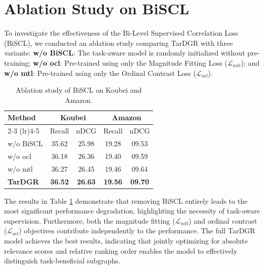 \documentclass[letterpaper]{article} %
\begin{document}
\section{Ablation Study on BiSCL}
To investigate the effectiveness of the Bi-Level Supervised Correlation Loss (BiSCL), we conducted an ablation study comparing TarDGR with three variants:
 \textbf{w/o BiSCL}: The task-aware model is randomly initialized without pre-training;
 \textbf{w/o ocl}: Pre-trained using only the Magnitude Fitting Loss ($\mathcal{L}_{mtl}$); and
 \textbf{w/o mtl}: Pre-trained using only the Ordinal Contrast Loss ($\mathcal{L}_{ocl}$).
\begin{table}[h]
    \centering
    \caption{Ablation study of BiSCL on Koubei and Amazon.}
    \label{tab:biscl_ablation}
    \setlength{\tabcolsep}{5pt}
    \begin{tabular}{lcccc}
        \toprule
        \multirow{2}{*}{\textbf{Method}} & \multicolumn{2}{c}{\textbf{Koubei}} & \multicolumn{2}{c}{\textbf{Amazon}} \\
        \cmidrule(lr){2-3} \cmidrule(lr){4-5}
         & Recall & nDCG & Recall & nDCG \\
        \midrule
        w/o BiSCL & 35.62 & 25.98 & 19.28 & 09.53 \\
        w/o ocl & 36.18 & 26.36 & 19.40 & 09.59 \\
        w/o mtl & 36.27 & 26.45 & 19.46 & 09.64 \\
        \textbf{TarDGR} & \textbf{36.52} & \textbf{26.63} & \textbf{19.56} & \textbf{09.70} \\
        \bottomrule
    \end{tabular}
\end{table}

The results in Table \ref{tab:biscl_ablation} demonstrate that removing BiSCL entirely leads to the most significant performance degradation, highlighting the necessity of task-aware supervision. Furthermore, both the magnitude fitting ($\mathcal{L}_{mtl}$) and ordinal contrast ($\mathcal{L}_{ocl}$) objectives contribute independently to the performance. The full TarDGR model achieves the best results, indicating that jointly optimizing for absolute relevance scores and relative ranking order enables the model to effectively distinguish task-beneficial subgraphs.


% 
\end{document}
